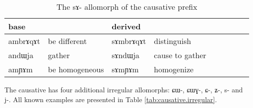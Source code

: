\documentclass[oldfontcommands,oneside,a4paper,11pt]{article}
\newcommand{\ipa}[1]{{\phon \mbox{#1}}} %
\begin{document}
\begin{table}[h]
\caption{The \ipa{sɤ}-   allomorph  of the causative prefix}\label{tab:causative.sA} \centering
\begin{tabular}{lllllllll} \toprule
  base & & derived & \\
 \midrule
 \ipa{ambrɤqɤt} & be different & \ipa{sɤmbrɤqɤt} & distinguish \\
\ipa{andɯja} & gather & \ipa{sɤndɯja} & cause to gather \\
 \ipa{amɲɤm} & be homogeneous & \ipa{sɤmɲɤm} & homogenize \\
 \bottomrule
\end{tabular}
\end{table}

The causative has four additional irregular allomorphs: \ipa{ɕɯ-}, \ipa{ɕɯɣ-}, \ipa{ɕ-}, \ipa{ʑ-}, \ipa{s-} and \ipa{j-}. All known examples are presented in Table \ref{tab:causative.irregular}.
\end{document}

